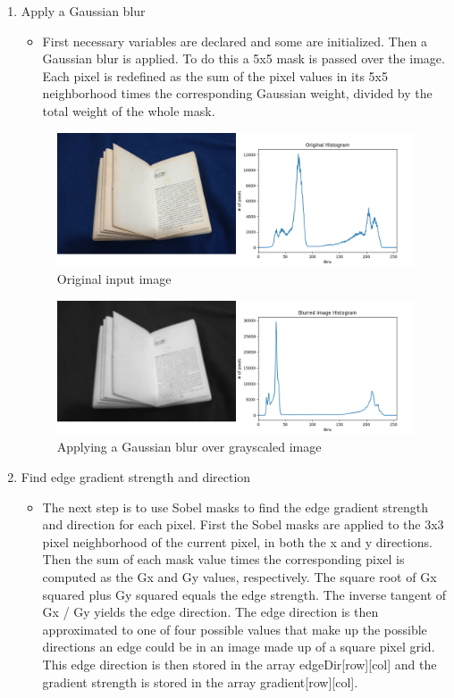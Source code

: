 \documentclass[BTech]{srmuthesis}
\begin{document}
\begin{enumerate}
    \item Apply a Gaussian blur 
    \\
    \begin{itemize}
        \item First necessary variables are declared and some are initialized. Then a Gaussian blur is applied. To do this a 5x5 mask is passed over the image. Each pixel is redefined as the sum of the pixel values in its 5x5 neighborhood times the corresponding Gaussian weight, divided by the total weight of the whole mask.
    \end{itemize}
    \begin{figure}[h!]
        \centering
        \includegraphics[width=15cm\textwidth]{win_frnds_blue_orig_hist}
        \caption{Original input image}
        \label{fig:Original input image}
    \end{figure}
    \begin{figure}[h!]
        \centering
        \includegraphics[width=15cm\textwidth]{win_frnds_blue_blurred_grayed_hist}
        \caption{Applying a Gaussian blur over grayscaled image}
        \label{fig:Applying Gaussian blur}
    \end{figure}
    \item Find edge gradient strength and direction
    \\
    \begin{itemize}
        \item The next step is to use Sobel masks to find the edge gradient strength and direction for each pixel. First the Sobel masks are applied to the 3x3 pixel neighborhood of the current pixel, in both the x and y directions. Then the sum of each mask value times the corresponding pixel is computed as the Gx and Gy values, respectively. The square root of Gx squared plus Gy squared equals the edge strength. The inverse tangent of Gx / Gy yields the edge direction. The edge direction is then approximated to one of four possible values that make up the possible directions an edge could be in an image made up of a square pixel grid. This edge direction is then stored in the array edgeDir[row][col] and the gradient strength is stored in the array gradient[row][col].

\end{itemize}
\end{enumerate}
\end{document}
